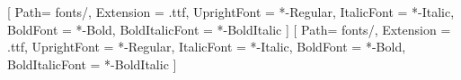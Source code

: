 \setsansfont{SourceSansPro}[
    Path= fonts/,
    Extension = .ttf,
    UprightFont = *-Regular,
    ItalicFont = *-Italic,
    BoldFont = *-Bold,
    BoldItalicFont = *-BoldItalic
]
\setmonofont{SourceCodePro}[
    Path= fonts/,
    Extension = .ttf,
    UprightFont = *-Regular,
    ItalicFont = *-Italic,
    BoldFont = *-Bold,
    BoldItalicFont = *-BoldItalic
]

\pgfplotsset{compat=1.9} %
\pgfplotsset{scaled y ticks=false} %
\pgfplotsset{scaled x ticks=false} %
\renewcommand{\contentsname}{Table of Contents} %
\renewcommand{\chapterautorefname}{Chapter} %
\renewcommand{\sectionautorefname}{Section} %
\renewcommand{\subsectionautorefname}{Section} %
\def\appendixautorefname{Appendix}

\makeatletter
\AtBeginDocument{%
    \expandafter\renewcommand\expandafter\subsection\expandafter{%
        \expandafter\@fb@secFB\subsection
    }%
}
\makeatother

\newcommand{\SmallSize}{0.3}
\newcommand{\MediumSize}{0.4}
\newcommand{\LargeSize}{0.55}

\newcommand\abstractname{Abstract}
\makeatletter
\if@titlepage
  \newenvironment{abstract}{%
      \titlepage
      \null\vfil
      \@beginparpenalty\@lowpenalty
      \begin{center}%
        \bfseries \abstractname
        \@endparpenalty\@M
      \end{center}}%
     {\par\vfil\null\endtitlepage}
\else
  \newenvironment{abstract}{%
      \if@twocolumn
        \section*{\abstractname}%
      \else
        \small
        \begin{center}%
          {\bfseries \abstractname\vspace{-.5em}\vspace{\z@}}%
        \end{center}%
        \quotation
      \fi}
      {\if@twocolumn\else\endquotation\fi}
\fi
\makeatother

